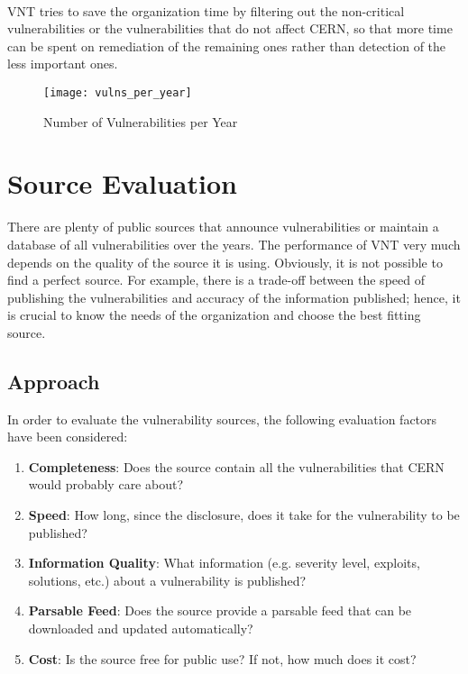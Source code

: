 \paragraph{}
VNT tries to save the organization time by filtering out the non-critical vulnerabilities or the vulnerabilities that do not affect CERN, so that more time can be spent on remediation of the remaining ones rather than detection of the less important ones.


\begin{figure}[h!]
\label{figure:vulns_per_year}
  \centering
    \texttt{[image: vulns\_per\_year]}
  \caption{Number of Vulnerabilities per Year}
  
\end{figure}

%

\section{Source Evaluation}
\label{source_evaluation}
There are plenty of public sources that announce vulnerabilities or maintain a database of all vulnerabilities over the years. The performance of VNT very much depends on the quality of the source it is using. Obviously, it is not possible to find a perfect source. For example, there is a trade-off between the speed of publishing the vulnerabilities and accuracy of the information published; hence, it is crucial to know the needs of the organization and choose the best fitting source.

\subsection{Approach}
In order to evaluate the vulnerability sources, the following evaluation factors have been considered:
\begin{enumerate}
\item \textbf{Completeness}: Does the source contain all the vulnerabilities that CERN would probably care about? 
\item \textbf{Speed}: How long, since the disclosure, does it take for the vulnerability to be published?
\item \textbf{Information Quality}: What information (e.g. severity level, exploits, solutions, etc.) about a vulnerability is published?
\item \textbf{Parsable Feed}: Does the source provide a parsable feed that can be downloaded and updated automatically?
\item \textbf{Cost}: Is the source free for public use? If not, how much does it cost?
\end{enumerate} 

